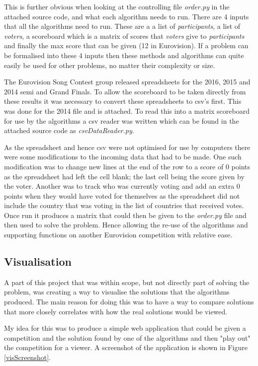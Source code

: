 \documentclass[12pt]{report}
\begin{document}
This is further obvious when looking at the controlling file \textit{order.py} in the attached source code, and what each algorithm needs to run. There are 4 inputs that all the algorithms need to run. These are a a list of \textit{participants}, a list of \textit{voters}, a scoreboard which is a matrix of scores that \textit{voters} give to \textit{participants} and finally the max score that can be given (12 in Eurovision). If a problem can be formalised into these 4 inputs then these methods and algorithms can quite easily be used for other problems, no matter their complexity or size.

The Eurovision Song Contest group released spreadsheets for the 2016, 2015 and 2014 semi and Grand Finals. To allow the scoreboard to be taken directly from these results it was necessary to convert these spreadsheets to csv's first. This was done for the 2014 file and is attached. To read this into a matrix scoreboard for use by the algorithms a csv reader was written which can be found in the attached source code as \textit{csvDataReader.py}.

As the spreadsheet and hence csv were not optimised for use by computers there were some modifications to the incoming data that had to be made. One such modification was to change new lines at the end of the row to a score of 0 points as the spreadsheet had left the cell blank; the last cell being the score given by the voter. Another was to track who was currently voting and add an extra 0 points when they would have voted for themselves as the spreadsheet did not include the country that was voting in the list of countries that received votes. Once run it produces a matrix that could then be given to the \textit{order.py} file and then used to solve the problem. Hence allowing the re-use of the algorithms and supporting functions on another Eurovision competition with relative ease.

\subsection{Visualisation}\label{Imp-Vis}
A part of this project that was within scope, but not directly part of solving the problem, was creating a way to visualise the solutions that the algorithms produced. The main reason for doing this was to have a way to compare solutions that more closely correlates with how the real solutions would be viewed.

My idea for this was to produce a simple web application that could be given a competition and the solution found by one of the algorithms and then "play out" the competition for a viewer. A screenshot of the application is shown in Figure \ref{visScreenshot}.
\end{document}
